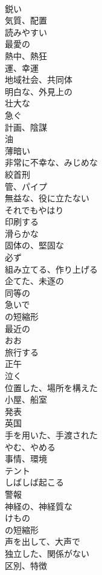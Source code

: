 \documentclass[8pt]{extreport}
\begin{document}
\begin{CJK}{UTF8}{min}
\\	鋭い	
\\	気質、配置	
\\	読みやすい	
\\	最愛の	
\\	熱中、熱狂	
\\	運、幸運	
\\	地域社会、共同体	
\\	明白な、外見上の	
\\	壮大な	
\\	急ぐ	
\\	計画、陰謀	
\\	油	
\\	薄暗い	
\\	非常に不幸な、みじめな	
\\	絞首刑	
\\	管、パイプ	
\\	無益な、役に立たない	
\\	それでもやはり	
\\	印刷する	
\\	滑らかな	
\\	固体の、堅固な	
\\	必ず	
\\	組み立てる、作り上げる	
\\	企てた、未逐の	
\\	同等の	
\\	急いで	
\\	の短縮形	
\\	最近の	
\\	おお	
\\	旅行する	
\\	正午	
\\	泣く	
\\	位置した、場所を構えた	
\\	小屋、船室	
\\	発表	
\\	英国	
\\	手を用いた、手渡された	
\\	やむ、やめる	
\\	事情、環境	
\\	テント	
\\	しばしば起こる	
\\	警報	
\\	神経の、神経質な	
\\	けもの	
\\	の短縮形	
\\	声を出して、大声で	
\\	独立した、関係がない	
\\	区別、特徴	

\end{CJK}
\end{document}

